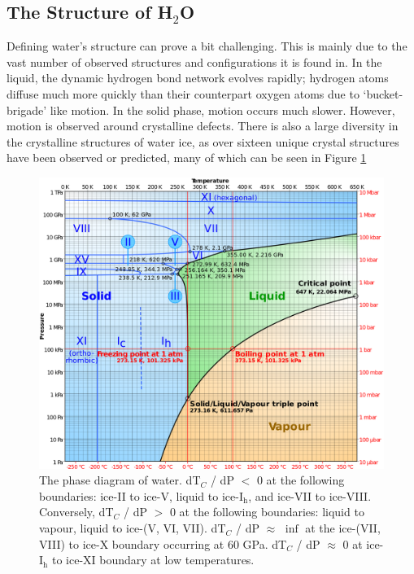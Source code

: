 \subsection{The Structure of H$_\mathrm{2}$O}
%
%
Defining water's structure can prove a bit challenging. This is mainly
due to the vast number of observed structures and configurations it is
found in. In the liquid, the dynamic hydrogen bond network evolves
rapidly; hydrogen atoms diffuse much more quickly than their
counterpart oxygen atoms due to `bucket-brigade' like motion. In the
solid phase, motion occurs much slower. However, motion is observed
around crystalline defects. There is also a large diversity in the
crystalline structures of water ice, as over sixteen unique crystal
structures have been observed or predicted\cite{Chaplin2018}, many of
which can be seen in Figure \ref{fig:phaseDiagram}

\begin{figure}
\includegraphics[width=\linewidth]{Figures/PhaseDiagram}
\caption{\label{fig:phaseDiagram} The phase diagram of
  water.\cite{Zhang2015} dT$_{C}$ / dP $<$ 0 at the following boundaries:
  ice-II to ice-V, liquid to ice-I$_\mathrm{h}$, and ice-VII to
  ice-VIII. Conversely, dT$_{C}$ / dP $>$ 0 at the following boundaries:
  liquid to vapour, liquid to ice-(V, VI, VII). dT$_{C}$ / dP $\approx$
  $\inf$ at the ice-(VII, VIII) to ice-X boundary occurring at 60 GPa.
  dT$_{C}$ / dP $\approx$ 0 at ice-I$_\mathrm{h}$ to ice-XI boundary at
  low temperatures. }
\end{figure}


